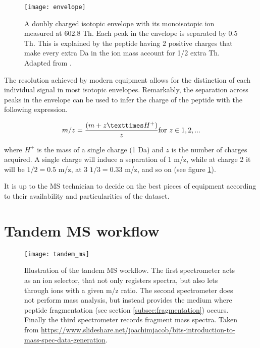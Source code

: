 \begin{figure}[!h]
\texttt{[image: envelope]}
\caption[Isotopic envelope]{A doubly charged isotopic envelope with its monoisotopic ion measured at 602.8 Th. Each peak in the envelope is separated by 0.5 Th. This is explained by the peptide having 2 positive charges that make every extra Da in the ion mass account for 1/2 extra Th. Adapted from \cite{Mirzaei2016}.}
\label{fig:envelope}
\end{figure}


The resolution achieved by modern equipment allows for the distinction of each individual signal in most isotopic envelopes. Remarkably, the separation across peaks in the envelope can be used to infer the charge of the peptide with the following expression.

\begin{equation}
m/z = \frac{(m + z × H^+)}{z} \text{for \textit{z}} \in {1, 2,...}
\end{equation}

where $H^+$ is the mass of a single charge (1 Da) and $z$ is the number of charges acquired. A single charge will induce a separation of 1 \ac{m/z}, while at charge 2 it will be $1/2 = 0.5$ \ac{m/z}, at 3 $1/3 = 0.33$ \ac{m/z}, and so on (see figure \ref{fig:envelope}).

It is up to the \ac{MS} technician to decide on the best pieces of equipment according to their availability and particularities of the dataset.

\section{Tandem MS workflow}
\label{sec:tandem_ms_workflow}

\begin{figure}[!h]
\texttt{[image: tandem\_ms]}
\caption[MS/MS schema]{Illustration of the tandem MS workflow. The first spectrometer acts as an ion selector, that not only registers spectra, but also lets through ions with a given \ac{m/z} ratio. The second spectrometer does not perform mass analysis, but instead provides the medium where peptide fragmentation (see section \ref{subsec:fragmentation}) occurs. Finally the third spectrometer records fragment mass spectra. Taken from \href{https://www.slideshare.net/joachimjacob/bits-introduction-to-mass-spec-data-generation}{https://www.slideshare.net/joachimjacob/bits-introduction-to-mass-spec-data-generation}.}
\label{fig:tandem_ms}
\end{figure}


